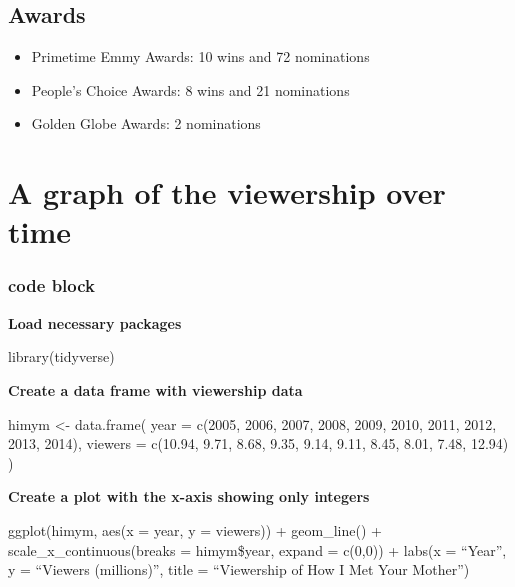 \documentclass[
  letterpaper,
  DIV=11,
  numbers=noendperiod]{scrartcl}
\providecommand{\tightlist}{%
  \setlength{\itemsep}{0pt}\setlength{\parskip}{0pt}}\usepackage{longtable,booktabs,array}
\begin{document}
\hypertarget{awards}{%
\subsection{Awards}\label{awards}}

\begin{itemize}
\tightlist
\item
  Primetime Emmy Awards: 10 wins and 72 nominations
\item
  People's Choice Awards: 8 wins and 21 nominations
\item
  Golden Globe Awards: 2 nominations
\end{itemize}

\hypertarget{a-graph-of-the-viewership-over-time}{%
\section{A graph of the viewership over
time}\label{a-graph-of-the-viewership-over-time}}

\hypertarget{code-block}{%
\subsubsection{code block}\label{code-block}}

\textbf{Load necessary packages}

library(tidyverse)

\textbf{Create a data frame with viewership data}

himym \textless- data.frame( year = c(2005, 2006, 2007, 2008, 2009,
2010, 2011, 2012, 2013, 2014), viewers = c(10.94, 9.71, 8.68, 9.35,
9.14, 9.11, 8.45, 8.01, 7.48, 12.94) )

\textbf{Create a plot with the x-axis showing only integers}

ggplot(himym, aes(x = year, y = viewers)) + geom\_line() +
scale\_x\_continuous(breaks = himym\$year, expand = c(0,0)) + labs(x =
``Year'', y = ``Viewers (millions)'', title = ``Viewership of How I Met
Your Mother'')
\end{document}

